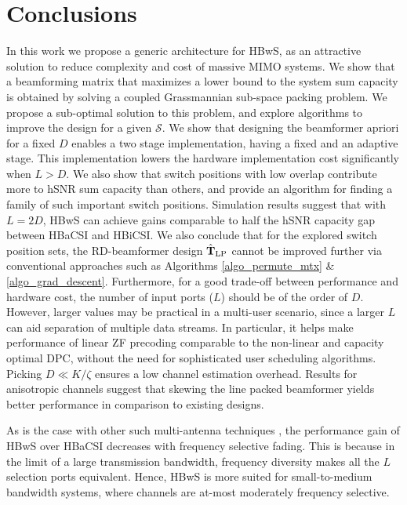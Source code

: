 \documentclass[journal,comsoc]{IEEEtran}
\begin{document}
\section{Conclusions} \label{sec_conclusions}
In this work we propose a generic architecture for HBwS, as an attractive solution to reduce complexity and cost of massive MIMO systems. We show that a beamforming matrix that maximizes a lower bound to the system sum capacity is obtained by solving a coupled Grassmannian sub-space packing problem. We propose a sub-optimal solution to this problem, and explore algorithms to improve the design for a given $\mathcal{S}$. 
%
We show that designing the beamformer apriori for a fixed $D$ enables a two stage implementation, having a fixed and an adaptive stage. This implementation lowers the hardware implementation cost significantly when $L > D$. We also show that switch positions with low overlap contribute more to hSNR sum capacity than others, and provide an algorithm for finding a family of such important switch positions. 
%
Simulation results suggest that with $L = 2D$, HBwS can achieve gains comparable to half the hSNR capacity gap between HBaCSI and HBiCSI. We also conclude that for the explored switch position sets, the RD-beamformer design $ \hat{\mathbf{T}}_{\rm LP}$ cannot be improved further via conventional approaches such as Algorithms \ref{algo_permute_mtx} \& \ref{algo_grad_descent}. 
%
Furthermore, for a good trade-off between performance and hardware cost, the number of input ports ($L$) should be of the order of $D$. However, larger values may be practical in a multi-user scenario, since a larger $L$ can aid separation of multiple data streams. In particular, it helps make performance of linear ZF precoding comparable to the non-linear and capacity optimal DPC, without the need for sophisticated user scheduling algorithms. Picking $D \ll K/\zeta$ ensures a low channel estimation overhead. Results for anisotropic channels suggest that skewing the line packed beamformer yields better performance in comparison to existing designs. 

As is the case with other such multi-antenna techniques \cite{Molisch_mag}, the performance gain of HBwS over HBaCSI decreases with frequency selective fading. This is because in the limit of a large transmission bandwidth, frequency diversity makes all the $L$ selection ports equivalent. Hence, HBwS is more suited for small-to-medium bandwidth systems, where channels are at-most moderately frequency selective.
\end{document}

